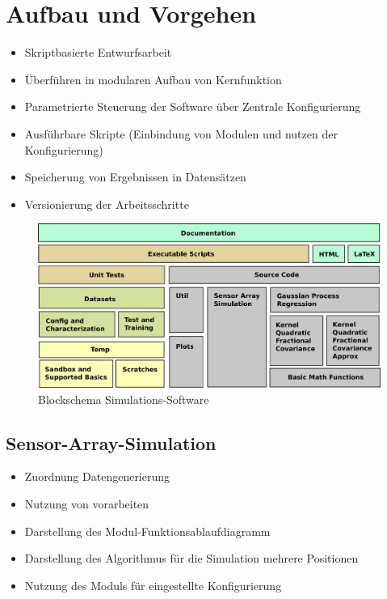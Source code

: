 \section{Aufbau und Vorgehen}\label{sec:aufbau-und-vorgehen}
	\begin{itemize}
		\item Skriptbasierte Entwurfsarbeit
		\item Überführen in modularen Aufbau von Kernfunktion
		\item Parametrierte Steuerung der Software über Zentrale Konfigurierung
		\item Ausführbare Skripte (Einbindung von Modulen und nutzen der Konfigurierung)
		\item Speicherung von Ergebnissen in Datensätzen
		\item Versionierung der Arbeitsschritte
	\end{itemize}


\begin{figure}[tbph]
	\centering
	\includegraphics[width=\linewidth]{chapters/images/3-SW-E-OExp/Blockschema_Software}
	\caption[Blockschema Simulations-Software]{Blockschema Simulations-Software}
	\label{fig:blockschemasoftware}
\end{figure}



\clearpage

\subsection{Sensor-Array-Simulation}\label{sub:sensor-array-av}
	\begin{itemize}
		\item Zuordnung Datengenerierung
		\item Nutzung von vorarbeiten
		\item Darstellung des Modul-Funktionsablaufdiagramm
		\item Darstellung des Algorithmus für die Simulation mehrere Positionen
		\item Nutzung des Moduls für eingestellte Konfigurierung
	\end{itemize}

